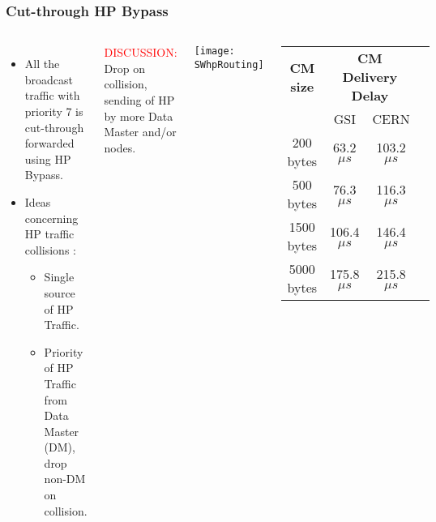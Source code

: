 \documentclass[]{beamer}
\begin{document}
\begin{frame}
  \frametitle{Cut-through HP Bypass}
 
  \begin{columns}[c]
  \column{2.8in}  %
  \begin{itemize}
  \item All the broadcast traffic with priority 7 is cut-through forwarded
        using  HP Bypass.
  \item Ideas concerning HP traffic collisions :
  \begin{itemize}
    \item Single source of HP Traffic.
    \item Priority of HP Traffic from Data Master (DM), drop non-DM on
          collision.
  \end{itemize}
  \end{itemize}
\centering
\textcolor{red}{DISCUSSION:} \\
Drop on collision, sending of HP by more Data Master and/or nodes.

  \column{2.3in}
  \centering
  \texttt{[image: SWhpRouting]}
  {\tiny
  \begin{table}[ht]
	  \begin{tabular}{| c | c | c | c |}          \hline
  \textbf{CM size}& \multicolumn{2}{|c|}{\textbf{CM Delivery Delay}}\\
		&    GSI           & CERN          \\ \hline
  200 bytes      &  63.2$\mu s$     & 103.2$\mu s$    \\ \hline
  500 bytes      &  76.3$\mu s$     & 116.3$\mu s$    \\ \hline
  1500 bytes     & 106.4$\mu s$     & 146.4$\mu s$    \\ \hline
  5000 bytes     & 175.8$\mu s$     & 215.8$\mu s$    \\ \hline
  \end{tabular}
  \label{tab:CMspDelay}
  \end{table}
  }

  \end{columns}

\end{frame}


\end{document}
